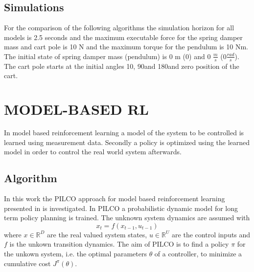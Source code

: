 \documentclass[letterpaper, 10 pt, conference]{ieeeconf}  %
\begin{document}
\subsection{Simulations}
For the comparison of the following algorithms the simulation horizon for all models is 2.5 seconds and the maximum executable force for the spring damper mass and cart pole is 10 N and the maximum torque for the pendulum is 10 Nm. The initial state of spring damper mass (pendulum) is 0 m (0\textdegree) and 0 $\frac{m}{s}$ (0$\frac{rad}{s}$). The cart pole starts at the initial angles 10\textdegree , 90\textdegree and 180\textdegree and zero position of the cart. 

\section{MODEL-BASED RL}
In model based reinforcement learning a model of the system to be controlled is learned using measurement data. Secondly a policy is optimized using the learned model in order to control the real world system afterwards.

\subsection{Algorithm}
In this work the PILCO %
approach for model based reinforcement learning presented in \cite{PILCO_paper} is investigated.%
\newline In PILCO a probabilistic dynamic model for long term policy planning is trained. The unknown system dynamics are assumed with 
\begin{equation}\label{PILCO_sysEq}
x_t = f\left(x_{t-1},u_{t-1}\right)
\end{equation}
where $x\in \mathbb{R}^D$ are the real valued system states, $u \in \mathbb{R}^U$ are the control inputs and $f$ is the unkown transition dynamics. The aim of PILCO is to find a policy $\pi$ for the unkown system, i.e. the optimal parameters $\theta$ of a controller, to minimize a cumulative cost $J^\pi\left(\theta\right)$. 
\end{document}
